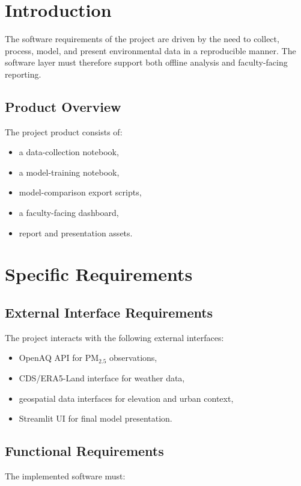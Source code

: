 \documentclass[12pt,a4paper]{report}
\begin{document}
\section{Introduction}
The software requirements of the project are driven by the need to collect, process, model, and present environmental data in a reproducible manner. The software layer must therefore support both offline analysis and faculty-facing reporting.

\subsection{Product Overview}
The project product consists of:

\begin{itemize}[leftmargin=1.3cm]
    \item a data-collection notebook,
    \item a model-training notebook,
    \item model-comparison export scripts,
    \item a faculty-facing dashboard,
    \item report and presentation assets.
\end{itemize}

\section{Specific Requirements}

\subsection{External Interface Requirements}
The project interacts with the following external interfaces:

\begin{itemize}[leftmargin=1.3cm]
    \item OpenAQ API for PM$_{2.5}$ observations,
    \item CDS/ERA5-Land interface for weather data,
    \item geospatial data interfaces for elevation and urban context,
    \item Streamlit UI for final model presentation.
\end{itemize}

\subsection{Functional Requirements}
The implemented software must:
\end{document}

